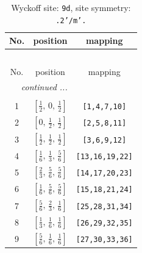 \documentclass[fleqn,8pt]{jsarticle}
\begin{document}
\begin{longtable}{ccc}
\caption{Wyckoff site: {\tt 9d}, site symmetry: {\tt .2'/m'.}}
 \\
 \hline \hline
No. & position & mapping \\ \hline \endfirsthead

\multicolumn{2}{l}{\tablename\ \thetable{}} \\
 \hline \hline
No. & position & mapping \\ \hline \endhead

 \hline \hline
\multicolumn{2}{r}{\footnotesize\it continued ...} \\ \endfoot

 \hline \hline
\multicolumn{2}{r}{} \\ \endlastfoot

1 & $\left[ \frac{1}{2},\, 0,\, \frac{1}{2} \right]$ & {\tt [1,4,7,10]} \\ \hline
2 & $\left[ 0,\, \frac{1}{2},\, \frac{1}{2} \right]$ & {\tt [2,5,8,11]} \\ \hline
3 & $\left[ \frac{1}{2},\, \frac{1}{2},\, \frac{1}{2} \right]$ & {\tt [3,6,9,12]} \\ \hline
4 & $\left[ \frac{1}{6},\, \frac{1}{3},\, \frac{5}{6} \right]$ & {\tt [13,16,19,22]} \\ \hline
5 & $\left[ \frac{2}{3},\, \frac{5}{6},\, \frac{5}{6} \right]$ & {\tt [14,17,20,23]} \\ \hline
6 & $\left[ \frac{1}{6},\, \frac{5}{6},\, \frac{5}{6} \right]$ & {\tt [15,18,21,24]} \\ \hline
7 & $\left[ \frac{5}{6},\, \frac{2}{3},\, \frac{1}{6} \right]$ & {\tt [25,28,31,34]} \\ \hline
8 & $\left[ \frac{1}{3},\, \frac{1}{6},\, \frac{1}{6} \right]$ & {\tt [26,29,32,35]} \\ \hline
9 & $\left[ \frac{5}{6},\, \frac{1}{6},\, \frac{1}{6} \right]$ & {\tt [27,30,33,36]} \\
\end{longtable}
\renewcommand{\arraystretch}{1.2}
\end{document}
